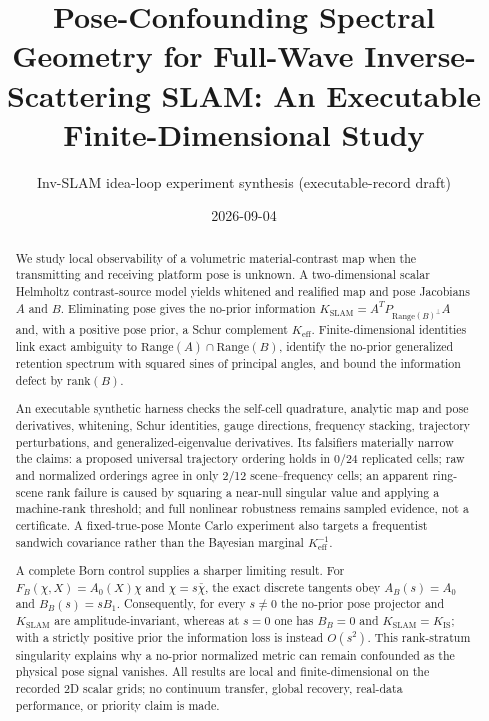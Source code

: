 \documentclass[12pt]{article}
\title{Pose-Confounding Spectral Geometry for Full-Wave Inverse-Scattering SLAM:
An Executable Finite-Dimensional Study}
\author{Inv-SLAM idea-loop experiment synthesis (executable-record draft)}
\date{2026-09-04}
\begin{document}
\maketitle

\begin{abstract}
We study local observability of a volumetric material-contrast map when the
transmitting and receiving platform pose is unknown. A two-dimensional scalar
Helmholtz contrast-source model yields whitened and realified map and pose
Jacobians $A$ and $B$. Eliminating pose gives the no-prior information
$K_{\mathrm{SLAM}}=A^T P_{\mathrm{Range}(B)^\perp}A$ and, with a positive pose
prior, a Schur complement $K_{\mathrm{eff}}$. Finite-dimensional identities
link exact ambiguity to $\mathrm{Range}(A)\cap\mathrm{Range}(B)$, identify the
no-prior generalized retention spectrum with squared sines of principal
angles, and bound the information defect by $\mathrm{rank}(B)$.

An executable synthetic harness checks the self-cell quadrature, analytic map
and pose derivatives, whitening, Schur identities, gauge directions,
frequency stacking, trajectory perturbations, and generalized-eigenvalue
derivatives. Its falsifiers materially narrow the claims: a proposed universal
trajectory ordering holds in 0/24 replicated cells; raw and normalized
orderings agree in only 2/12 scene--frequency cells; an apparent ring-scene
rank failure is caused by squaring a near-null singular value and applying a
machine-rank threshold; and full nonlinear robustness remains sampled evidence,
not a certificate. A fixed-true-pose Monte Carlo experiment also targets a
frequentist sandwich covariance rather than the Bayesian marginal
$K_{\mathrm{eff}}^{-1}$.

A complete Born control supplies a sharper limiting result. For
$F_B(\chi,X)=A_0(X)\chi$ and $\chi=s\bar\chi$, the exact discrete tangents obey
$A_B(s)=A_0$ and $B_B(s)=sB_1$. Consequently, for every $s\ne0$ the no-prior
pose projector and $K_{\mathrm{SLAM}}$ are amplitude-invariant, whereas at
$s=0$ one has $B_B=0$ and $K_{\mathrm{SLAM}}=K_{\mathrm{IS}}$; with a strictly
positive prior the information loss is instead $O(s^2)$. This rank-stratum
singularity explains why a no-prior normalized metric can remain confounded as
the physical pose signal vanishes. All results are local and
finite-dimensional on the recorded 2D scalar grids; no continuum transfer,
global recovery, real-data performance, or priority claim is made.
\end{abstract}
\end{document}
